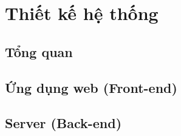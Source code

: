 
\chapter{Thiết kế hệ thống} %

\label{Chapter6}
\section{Tổng quan}
\section{Ứng dụng web (Front-end)}
\section{Server (Back-end)}